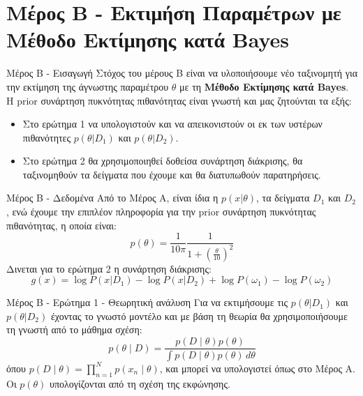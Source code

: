 \documentclass{beamer}
\begin{document}
\section{Μέρος Β - Εκτιμήση Παραμέτρων με Μέθοδο Εκτίμησης κατά Bayes}
\begin{frame}{Μέρος Β - Εισαγωγή}
    Στόχος του μέρους Β είναι να υλοποιήσουμε νέο ταξινομητή για την εκτίμηση της άγνωστης παραμέτρου $\theta$ με τη \textbf{Μέθοδο Εκτίμησης κατά Bayes}. Η prior συνάρτηση πυκνότητας πιθανότητας είναι γνωστή και μας ζητούνται τα εξής:
    \begin{itemize}
        \item Στο ερώτημα 1 να υπολογιστούν και να απεικονιστούν οι εκ των υστέρων πιθανότητες $p(\theta|D_1)$ και $p(\theta|D_2)$.
        \item Στο ερώτημα 2 θα χρησιμοποιηθεί δοθείσα συνάρτηση διάκρισης, θα
ταξινομηθούν τα δείγματα που έχουμε και θα διατυπωθούν
παρατηρήσεις.
    \end{itemize}
\end{frame}
\begin{frame}{Μέρος Β - Δεδομένα}
Από το Μέρος Α, είναι ίδια η $p(x|\theta)$, τα δείγματα $D_1$ και $D_2$, ενώ έχουμε την επιπλέον πληροφορία για την prior συνάρτηση πυκνότητας πιθανότητας, η οποία είναι:
$$p(\theta) = \frac{1}{10\pi} \frac{1}{1 + \left(\frac{\theta}{10}\right)^2}$$
Δινεται για το ερώτημα 2 η συνάρτηση διάκρισης:
$$g(x) = \log P(x | D_1) - \log P(x | D_2) + \log P(\omega_1) - \log P(\omega_2)$$

\end{frame}
\begin{frame}{Μέρος B - Ερώτημα 1 - Θεωρητική ανάλυση}
    Για να εκτιμήσουμε τις $p(\theta|D_1)$ και $p(\theta|D_2)$ έχοντας το γνωστό μοντέλο και με βάση τη θεωρία θα χρησιμοποιήσουμε τη γνωστή από το μάθημα σχέση:
    $$p(\theta \mid D) = \frac{p(D \mid \theta)p(\theta)}{\int p(D \mid \theta)p(\theta) \, d\theta}$$
    όπου $p(D \mid \theta) = \prod_{n=1}^{N} p(x_n \mid \theta)$, και μπορεί να υπολογιστεί όπως στο Μέρος Α. \\
    Οι $p(\theta)$ υπολογίζονται από τη σχέση της εκφώνησης.
\end{frame}
\end{document}
